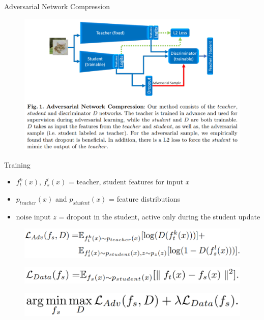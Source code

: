 \documentclass{beamer}
\begin{document}
\begin{frame}{Adversarial Network Compression}

\begin{figure}[h]
\includegraphics[width=\textwidth]{img/GAN_distill}
\end{figure}

\end{frame}
\begin{frame}{Training}

\begin{itemize}
\item $f_t^k(x)$, $f_s^l(x)$ = teacher, student features for input $x$
\item $p_{teacher}(x)$ and $p_{student}(x)$ = feature distributions
\item noise input $z$ = dropout in the student, active only during the student update
\end{itemize}

\begin{figure}[h]
\includegraphics[scale=0.5]{img/GAN_distill_train}
\end{figure}

\begin{figure}[h]
\includegraphics[scale=0.4]{img/l_data}
\end{figure}

\begin{figure}[h]
\includegraphics[scale=0.35]{img/argmin}
\end{figure}

\end{frame}
\end{document}
